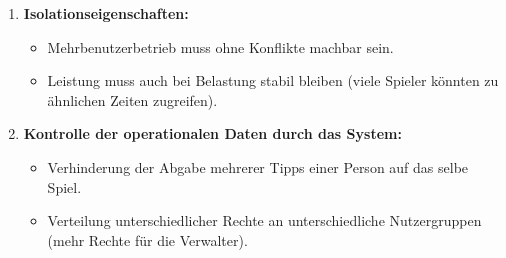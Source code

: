 \documentclass[a4paper,11pt,fleqn]{scrartcl}
\begin{document}
\begin{enumerate}
\begin{enumerate}
\begin{enumerate}
\begin{itemize}
                \end{itemize}
                \item \textbf{Isolationseigenschaften:}
                \begin{itemize}
                    \item Mehrbenutzerbetrieb muss ohne Konflikte machbar sein.
                    \item Leistung muss auch bei Belastung stabil bleiben (viele Spieler könnten zu ähnlichen Zeiten 
                    zugreifen).
                \end{itemize}
                \item \textbf{Kontrolle der operationalen Daten durch das System:}
                \begin{itemize}
                    \item Verhinderung der Abgabe mehrerer Tipps einer Person auf das selbe Spiel.
                    \item Verteilung unterschiedlicher Rechte an unterschiedliche Nutzergruppen (mehr Rechte für die 
                    Verwalter).
                \end{itemize}
            \end{enumerate}
            

\end{enumerate}
\end{enumerate}
\end{document}
